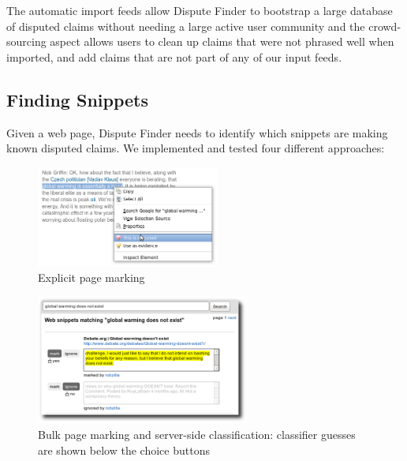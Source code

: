 \documentclass{www2010-submission}
\newcommand{\todo}[1]{}
\begin{document}
The automatic import feeds allow Dispute Finder to bootstrap a large database of disputed claims without needing a large active user community and the crowd-sourcing aspect allows users to clean up claims that were not phrased well when imported, and add claims that are not part of any of our input feeds.

\todo{Say how many disputed claims}

\todo{talk about duplicates}

\todo{Actually import the Politifact data}

\subsection{Finding Snippets}

Given a web page, Dispute Finder needs to identify which snippets are making known disputed claims. We implemented and tested four different approaches:

\begin{figure}[tb]
	\begin{center}
	\includegraphics[width=6cm]{pictures/mark_disputed.png}
	\caption{Explicit page marking}
	\label{mark_disputed}
	\end{center}
\end{figure}

\begin{figure}[tb]
	\begin{center}
	\includegraphics[width=7cm]{pictures/training2.png}
	\caption{Bulk page marking and server-side classification: classifier guesses are shown below the choice buttons}
	\label{training}
	\end{center}
\end{figure}
\end{document}
